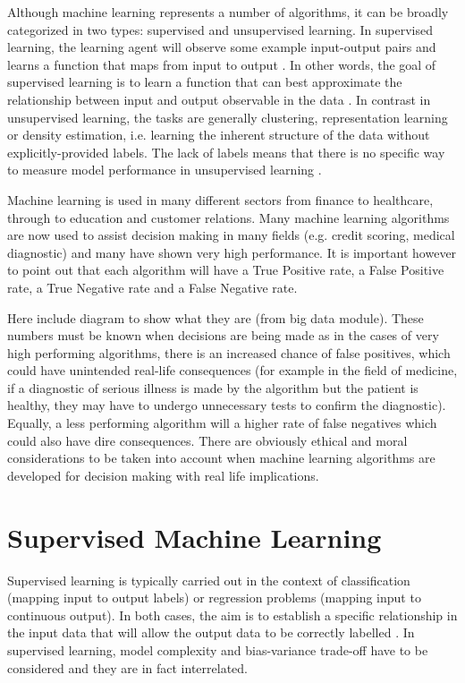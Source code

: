 Although machine learning represents a number of algorithms, it can be broadly categorized in two types: supervised and unsupervised learning. In supervised learning, the learning agent will observe some example input-output pairs and learns a function that maps from input to output \citep{Russell:2016tz}. In other words, the goal of supervised learning is to learn a function that can best approximate the relationship between input and output observable in the data \citep{Mullainathan:uy}. 
In contrast in unsupervised learning, the tasks are generally clustering, representation learning or density estimation, i.e. learning the inherent structure of the data without explicitly-provided labels. The lack of labels means that there is no specific way to measure model performance in unsupervised learning \citep{Soni:tr}.

Machine learning is used in many different sectors from finance to healthcare, through to education and customer relations. Many machine learning algorithms are now used to assist decision making in many fields (e.g. credit scoring, medical diagnostic) and many have shown very high performance. It is important however to point out that each algorithm will have a True Positive rate, a False Positive rate, a True Negative rate and a False Negative rate.

Here include diagram to show what they are (from big data module). 
These numbers must be known when decisions are being made as in the cases of very high performing algorithms, there is an increased chance of false positives, which could have unintended real-life consequences (for example in the field of medicine, if a diagnostic of serious illness is made by the algorithm but the patient is healthy, they may have to undergo unnecessary tests to confirm the diagnostic). Equally, a less performing algorithm will a higher rate of false negatives which could also have dire consequences. There are obviously ethical and moral considerations to be taken into account when machine learning algorithms are developed for decision making with real life implications. 



\section{Supervised Machine Learning}
Supervised learning is typically carried out in the context of classification (mapping input to output labels) or regression problems (mapping input to continuous output). In both cases, the aim is to establish a specific relationship in the input data that will allow the output data to be correctly labelled \citep{Soni:tr}. In supervised learning, model complexity and bias-variance trade-off have to be considered and they are in fact interrelated.


